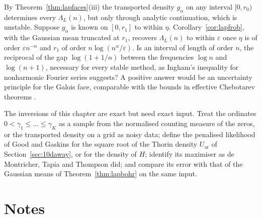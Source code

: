 \begin{problem}\label{op:lapwindow}
By Theorem~\ref{thm:lapfaces}(iii) the transported density $g_\alpha$ on any interval $[0,r_0)$ determines every $\Lambda_L(n)$, but only through analytic continuation, which is unstable. Suppose $g_\alpha$ is known on $[0,r_1]$ to within $\eta$. Corollary~\ref{cor:lapfrob}, with the Gaussian mean truncated at $r_1$, recovers $\Lambda_L(n)$ to within $\varepsilon$ once $\eta$ is of order $\varepsilon n^{-\alpha}$ and $r_1$ of order $n\log(n^\alpha/\varepsilon)$. Is an interval of length of order $n$, the reciprocal of the gap $\log(1+1/n)$ between the frequencies $\log n$ and $\log(n+1)$, necessary for every stable method, as Ingham's inequality for nonharmonic Fourier series \cite{ingham1936} suggests? A positive answer would be an uncertainty principle for the Galois face, comparable with the bounds in effective Chebotarev theorems \cite{lagariasodlyzko1977}.
\end{problem}

\begin{problem}\label{op:lapgg}
The inversions of this chapter are exact but need exact input. Treat the ordinates $0<\gamma_1\le\dots\le\gamma_K$ as a sample from the normalised counting measure of the zeros, or the transported density on a grid as noisy data; define the penalised likelihood of Good and Gaskins for the square root of the Thorin density $U_{\mathrm{ar}}$ of Section~\ref{sec:10daway}, or for the density of $H$; identify its maximiser as de Montricher, Tapia and Thompson did; and compare its error with that of the Gaussian means of Theorem~\ref{thm:lapbohr} on the same input.
\end{problem}

\section{Notes}

